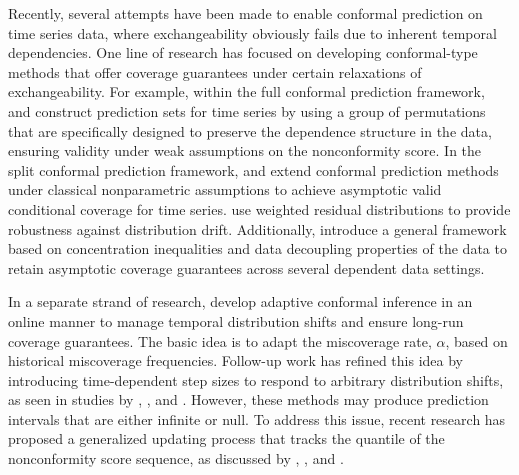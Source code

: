 \documentclass[
  11pt,
  12pt]{article}
\theoremstyle{plain}
\theoremstyle{remark}
\begin{document}
Recently, several attempts have been made to enable conformal prediction
on time series data, where exchangeability obviously fails due to
inherent temporal dependencies. One line of research has focused on
developing conformal-type methods that offer coverage guarantees under
certain relaxations of exchangeability. For example, within the full
conformal prediction framework, \citet{chernozhukov2018} and
\citet{yu2022} construct prediction sets for time series by using a
group of permutations that are specifically designed to preserve the
dependence structure in the data, ensuring validity under weak
assumptions on the nonconformity score. In the split conformal
prediction framework, \citet{xu2021} and \citet{xu2023} extend conformal
prediction methods under classical nonparametric assumptions to achieve
asymptotic valid conditional coverage for time series.
\citet{barber2023} use weighted residual distributions to provide
robustness against distribution drift. Additionally,
\citet{oliveira2024} introduce a general framework based on
concentration inequalities and data decoupling properties of the data to
retain asymptotic coverage guarantees across several dependent data
settings.

In a separate strand of research, \citet{gibbs2021} develop adaptive
conformal inference in an online manner to manage temporal distribution
shifts and ensure long-run coverage guarantees. The basic idea is to
adapt the miscoverage rate, \(\alpha\), based on historical miscoverage
frequencies. Follow-up work has refined this idea by introducing
time-dependent step sizes to respond to arbitrary distribution shifts,
as seen in studies by \citet{bastani2022}, \citet{zaffran2022}, and
\citet{gibbs2024}. However, these methods may produce prediction
intervals that are either infinite or null. To address this issue,
recent research has proposed a generalized updating process that tracks
the quantile of the nonconformity score sequence, as discussed by
\citet{bhatnagar2023}, \citet{angelopoulos2024}, and
\citet{angelopoulos2024online}.
\end{document}
